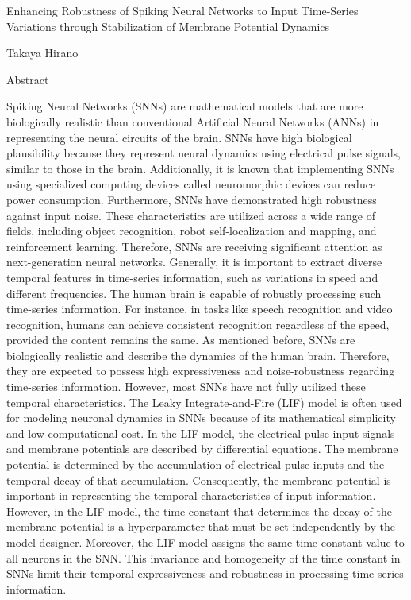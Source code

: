 \pagestyle{empty}

\begin{center}
    Enhancing Robustness of Spiking Neural Networks to Input Time-Series Variations through Stabilization of Membrane Potential Dynamics
\end{center}
\vspace{10mm}
\begin{center}
    Takaya Hirano
\end{center}
\vspace{10mm}

\begin{center}
    Abstract
\end{center}
\vspace{10mm}

Spiking Neural Networks (SNNs) are mathematical models that are more biologically realistic than conventional Artificial Neural Networks (ANNs) in representing the neural circuits of the brain.
SNNs have high biological plausibility because they represent neural dynamics using electrical pulse signals, similar to those in the brain.
Additionally, it is known that implementing SNNs using specialized computing devices called neuromorphic devices can reduce power consumption. 
Furthermore, SNNs have demonstrated high robustness against input noise.
These characteristics are utilized across a wide range of fields, including object recognition, robot self-localization and mapping, and reinforcement learning.
Therefore, SNNs are receiving significant attention as next-generation neural networks.
Generally, it is important to extract diverse temporal features in time-series information, such as variations in speed and different frequencies. 
The human brain is capable of robustly processing such time-series information.
For instance, in tasks like speech recognition and video recognition, humans can achieve consistent recognition regardless of the speed, provided the content remains the same.
As mentioned before, SNNs are biologically realistic and describe the dynamics of the human brain.
Therefore, they are expected to possess high expressiveness and noise-robustness regarding time-series information.
However, most SNNs have not fully utilized these temporal characteristics. 
The Leaky Integrate-and-Fire (LIF) model is often used for modeling neuronal dynamics in SNNs because of its mathematical simplicity and low computational cost. 
In the LIF model, the electrical pulse input signals and membrane potentials are described by differential equations. 
The membrane potential is determined by the accumulation of electrical pulse inputs and the temporal decay of that accumulation. 
Consequently, the membrane potential is important in representing the temporal characteristics of input information. 
However, in the LIF model, the time constant that determines the decay of the membrane potential is a hyperparameter that must be set independently by the model designer. 
Moreover, the LIF model assigns the same time constant value to all neurons in the SNN. 
This invariance and homogeneity of the time constant in SNNs limit their temporal expressiveness and robustness in processing time-series information.

